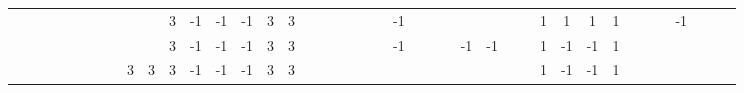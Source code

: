 \begin{table}[H]
{\begin{tabular}{ccccccccccccccccccccccccccccccccccccccccc}
   &    &                           &                           &                           &                           &                           &                           &                           &                           & \cellcolor[HTML]{3531FF}3 & -1                        & -1                        & -1                        & \cellcolor[HTML]{3531FF}3 & \cellcolor[HTML]{3531FF}3 &                           &                           &                           &                           &                           &                           & -1                        &    &    &    &                           &                           &                           &                           & \cellcolor[HTML]{329A9D}1 & \cellcolor[HTML]{329A9D}1 & \cellcolor[HTML]{329A9D}1 & \cellcolor[HTML]{329A9D}1 &                           &                           &                           & -1                        &  &  &  \\
   &    &                           &                           &                           &                           &                           &                           &                           &                           & \cellcolor[HTML]{3531FF}3 & -1                        & -1                        & -1                        & \cellcolor[HTML]{3531FF}3 & \cellcolor[HTML]{3531FF}3 &                           &                           &                           &                           &                           &                           & -1                        &    &    &    & -1                        & -1                        &                           &                           & \cellcolor[HTML]{329A9D}1 & -1                        & -1                        & \cellcolor[HTML]{329A9D}1 &                           &                           &                           &                           &  &  &  \\
   &    &                           &                           &                           &                           &                           &                           & \cellcolor[HTML]{3531FF}3 & \cellcolor[HTML]{3531FF}3 & \cellcolor[HTML]{3531FF}3 & -1                        & -1                        & -1                        & \cellcolor[HTML]{3531FF}3 & \cellcolor[HTML]{3531FF}3 &                           &                           &                           &                           &                           &                           &                           &    &    &    &                           &                           &                           &                           & \cellcolor[HTML]{329A9D}1 & -1                        & -1                        & \cellcolor[HTML]{329A9D}1 &                           &                           &                           &                           &  &  & 
\end{tabular}
}
\end{table}
